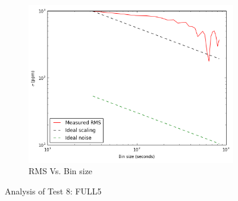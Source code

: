 \documentclass{aastex6}
\begin{document}
\begin{figure}[H]
    \begin{subfigure}{3}
        \includegraphics[scale=0.6]{rms_test8}
        \caption{RMS Vs. Bin size}
    \end{subfigure}
    \caption{Analysis of Test 8: FULL5}
\end{figure}
\end{document}
